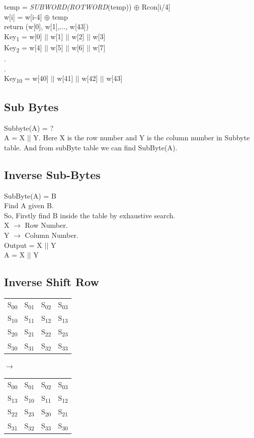 \documentclass[11pt]{article}
\begin{document}
	\hspace*{1.3cm}temp = \textit{SUBWORD(ROTWORD}(temp)) $\oplus$ Rcon[i/4]\\
	\hspace*{0.8cm}w[i] = w[i-4] $\oplus$ temp\\
	return (w[0], w[1],..., w[43])\vspace{0.1cm}\\
	Key\textsubscript{1} = w[0] $||$ w[1] $||$ w[2] $||$ w[3]\\
	Key\textsubscript{2} = w[4] $||$ w[5] $||$ w[6] $||$ w[7]\\
	.\\
	.\\
	Key\textsubscript{10} = w[40] $||$ w[41] $||$ w[42] $||$ w[43]
	\subsection{Sub Bytes}
	Subbyte(A) = ?\\
	A = X $||$ Y. Here X is the row number and Y is the column number in Subbyte table. And from subByte table we can find SubByte(A).
	\subsection{Inverse Sub-Bytes}
	SubByte(A) = B\\ 
	Find A given B.\\
	So, Firstly find B inside the table by exhaustive search.\\
	X $\rightarrow$ Row Number.\\
	Y $\rightarrow$ Column Number.\\
	Output = X $||$ Y\\
	A = X $||$ Y
	\subsection{Inverse Shift Row}
	\begin{tabular}{| c c c c |}
		S\textsubscript{00} & S\textsubscript{01} & S\textsubscript{02} & S\textsubscript{03}\\
		S\textsubscript{10} & S\textsubscript{11} & S\textsubscript{12} & S\textsubscript{13}\\
		S\textsubscript{20} & S\textsubscript{21} & S\textsubscript{22} & S\textsubscript{23}\\
		S\textsubscript{30} & S\textsubscript{31} & S\textsubscript{32} & S\textsubscript{33}
	\end{tabular}\hspace{0.2cm}$\rightarrow$\hspace{0.2cm}
	\begin{tabular}{| c c c c |}
		S\textsubscript{00} & S\textsubscript{01} & S\textsubscript{02} & S\textsubscript{03}\\
		S\textsubscript{13} & S\textsubscript{10}&S\textsubscript{11} & S\textsubscript{12}\\
		S\textsubscript{22}&S\textsubscript{23} & S\textsubscript{20} & S\textsubscript{21}\\
		S\textsubscript{31} & S\textsubscript{32} & S\textsubscript{33} &S\textsubscript{30}
	\end{tabular} 
\end{document}
